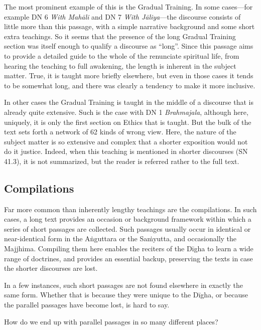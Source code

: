 \documentclass[12pt,openany]{book}%
\begin{document}
The most prominent example of this is the Gradual Training. In some cases—for example DN 6 \textit{With \textsanskrit{Mahāli}} and DN 7 \textit{With \textsanskrit{Jāliya}}—the discourse consists of little more than this passage, with a simple narrative background and some short extra teachings. So it seems that the presence of the long Gradual Training section was itself enough to qualify a discourse as “long”. Since this passage aims to provide a detailed guide to the whole of the renunciate spiritual life, from hearing the teaching to full awakening, the length is inherent in the subject matter. True, it is taught more briefly elsewhere, but even in those cases it tends to be somewhat long, and there was clearly a tendency to make it more inclusive.

In other cases the Gradual Training is taught in the middle of a discourse that is already quite extensive. Such is the case with DN 1 \textit{Brahmajala}, although here, uniquely, it is only the first section on Ethics that is taught. But the bulk of the text sets forth a network of 62 kinds of wrong view. Here, the nature of the subject matter is so extensive and complex that a shorter exposition would not do it justice. Indeed, when this teaching is mentioned in shorter discourses (SN 41.3), it is not summarized, but the reader is referred rather to the full text.

\subsection*{Compilations}

Far more common than inherently lengthy teachings are the compilations. In such cases, a long text provides an occasion or background framework within which a series of short passages are collected. Such passages usually occur in identical or near-identical form in the \textsanskrit{Aṅguttara} or the \textsanskrit{Saṁyutta}, and occasionally the Majjhima. Compiling them here enables the reciters of the \textsanskrit{Dīgha} to learn a wide range of doctrines, and provides an essential backup, preserving the texts in case the shorter discourses are lost.

In a few instances, such short passages are not found elsewhere in exactly the same form. Whether that is because they were unique to the \textsanskrit{Dīgha}, or because the parallel passages have become lost, is hard to say.

How do we end up with parallel passages in so many different places?
\end{document}
